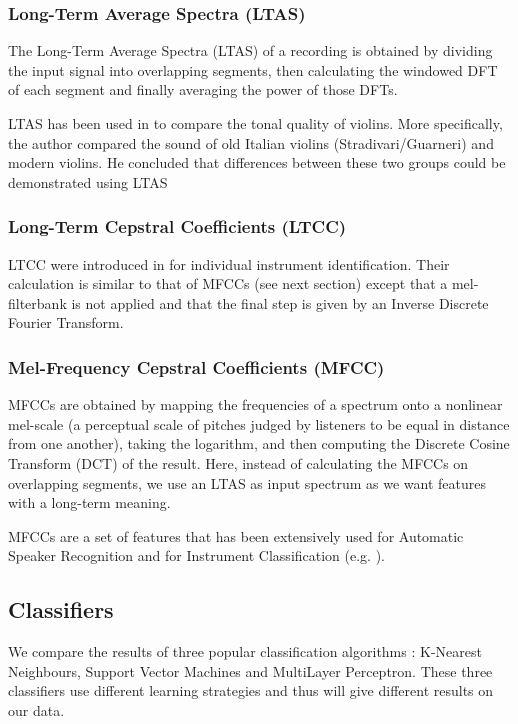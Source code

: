 \documentclass[11pt]{article}
\begin{document}
\subsubsection{Long-Term Average Spectra (LTAS)}
The Long-Term Average Spectra (LTAS) of a recording is obtained by dividing the input signal into overlapping segments, then calculating the windowed DFT of each segment and finally averaging the power of those DFTs.

\noindent LTAS has been used in \cite{buen2005} to compare the tonal quality of violins. More specifically, the author compared the sound of old Italian violins (Stradivari/Guarneri) and modern violins. He concluded that differences between these two groups could be demonstrated using LTAS


\subsubsection{Long-Term Cepstral Coefficients (LTCC)}
LTCC were introduced in \cite{lukasik2010} for individual instrument identification. Their calculation is similar to that of MFCCs (see next section) except that a mel-filterbank is not applied and that the final step is given by an Inverse Discrete Fourier Transform.

\subsubsection{Mel-Frequency Cepstral Coefficients (MFCC)}

MFCCs are obtained by mapping the frequencies of a spectrum onto a nonlinear mel-scale (a perceptual scale of pitches judged by listeners to be equal in distance from one another), taking the logarithm, and then computing the Discrete Cosine Transform (DCT) of the result. Here, instead of calculating the MFCCs on overlapping segments, we use an LTAS as input spectrum as we want features with a long-term meaning.

\noindent MFCCs are a set of features that has been extensively used for Automatic Speaker Recognition and for Instrument Classification (e.g. \cite{eronen2000, deng2008}).

\subsection{Classifiers}
We compare the results of three popular classification algorithms : K-Nearest Neighbours, Support Vector Machines and MultiLayer Perceptron. These three classifiers use different learning strategies and thus will give different results on our data.
\end{document}

